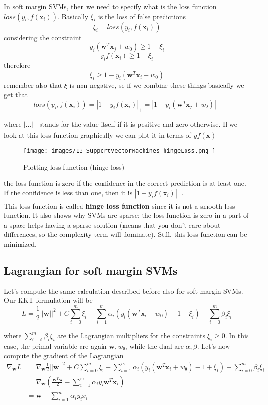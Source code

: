 In soft margin SVMs, then we need to specify what is the loss function
$loss(y_{i}, f(\pmb{x}_{i}))$. Basically $\xi_{i}$ is the loss of false predictions
\[
	\xi_{i}= loss(y_{i}, f(\pmb{x}_{i}))
\]
considering the constraint
\[
	y_{i}(\pmb{w}^{T}\pmb{x}_{j}+ w_{0}) \geq 1 - \xi_{i}
\]
\[
	y_{i}f(\pmb{x}_{i}) \geq 1 - \xi_{i}
\]
therefore
\[
	\xi_{i}\geq 1 - y_{i}(\pmb{w}^{T}\pmb{x}_{i}+ w_{0})
\]
remember also that $\xi$ is non-negative, so if we combine these things
basically we get that
\begin{equation}
	loss(y_{i}, f(\pmb{x}_{i})) = |1 - y_{i}f(\pmb{x}_{i})|_{+}= |1 - y_{i}(\pmb{w}
	^{T}\pmb{x}_{j}+ w_{0})|_{+}
\end{equation}

where $|\dots|_{+}$ stands for the value itself if it is positive and zero otherwise.
If we look at this loss function graphically we can plot it in terms of
$y f(\pmb{x})$
\begin{figure}[H]
	\centering
	\texttt{[image: 
        images/13\_SupportVectorMachines\_hingeLoss.png
    ]}
	\caption{Plotting loss function (hinge loss)}
	\label{fig:plot_loss_fun}
\end{figure}
the loss function is zero if the confidence in the correct prediction is at
least one. If the confidence is less than one, then it is
$|1 - y_{i}f(\pmb{x}_{i})|_{+}$.\\ This loss function is called \textbf{hinge
loss function} since it is not a smooth loss function. It also shows why SVMs
are sparse: the loss function is zero in a part of a space helps having a sparse
solution (means that you don't care about differences, so the complexity term will
dominate). Still, this loss function can be minimized.

\subsection{Lagrangian for soft margin SVMs}
Let's compute the same calculation described before also for soft margin SVMs. Our
KKT formulation will be
\[
	L = \frac{1}{2}||\pmb{w}||^{2}+ C \sum_{i=0}^{m}\xi_{i}- \sum_{i=1}^{m}\alpha_{i}
	(y_{i}(\pmb{w}^{T}\pmb{x}_{i}+ w_{0}) - 1 + \xi_{i}) -\sum_{i=0}^{m}\beta_{i}\xi
	_{i}
\]

where $\sum_{i=0}^{m}\beta_{i}\xi_{i}$ are the Lagrangian multipliers for the
constraints $\xi_{i}\geq 0$. In this case, the primal variable are again
$\pmb{w}, w_{0}$, while the dual are $\alpha, \beta$. Let's now compute the
gradient of the Lagrangian
\begin{align*}
	\nabla_{\pmb{w}}L & = \nabla_{\pmb{w}}{\frac{1}{2} ||\pmb{w}||^2 + C \sum_{i=0}^m \xi_i - \sum_{i=1}^m \alpha_i (y_i (\pmb{w}^T \pmb{x}_i + w_0) - 1 + \xi_i) -\sum_{i=0}^m \beta_i \xi_i} \\
	                  & = \nabla_{\pmb{w}}\left( \frac{\pmb{w}^{T}\pmb{w}}{2}- \sum_{i=1}^{m}\alpha_{i}y_{i}\pmb{w}^{T}\pmb{x}_{i}\right)                                                      \\
	                  & = \pmb{w}- \sum_{i=1}^{m}\alpha_{i}y_{i}x_{i}
\end{align*}

